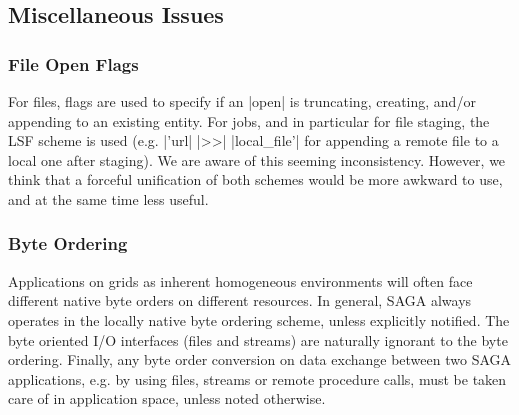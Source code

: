   \subsection{Miscellaneous Issues}

  \subsubsection{File Open Flags}

   For files, flags are used to specify if   an |open| is
   truncating, creating, and/or appending to an existing entity.
   For jobs, and in particular for file staging, the LSF scheme
   is used (e.g.  |'url| |>>| |local_file'| for appending a
   remote file to a local one after staging).  We are aware of
   this seeming inconsistency.  However, we think that a
   forceful unification of both schemes would be more awkward to
   use, and at the same time less useful.

  \subsubsection{Byte Ordering}

   Applications on grids as inherent
   homogeneous environments will often face different native
   byte orders on different resources.  In general, SAGA always
   operates in the locally native byte ordering scheme, unless
   explicitly notified.  The byte oriented I/O interfaces
   (files and streams) are naturally ignorant to the byte
   ordering.  Finally, any byte order conversion on data
   exchange between two SAGA applications, e.g. by using files,
   streams or remote procedure calls, must be taken care of in
   application space, unless noted otherwise.





